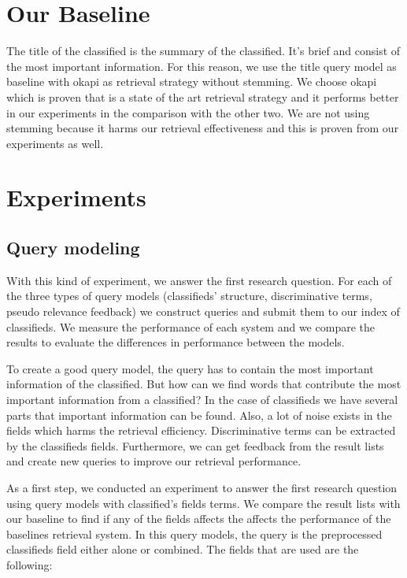 \section{Our Baseline}
The title of the classified is the summary of the classified. It's brief and consist of the most important information. For this reason, we use the title query model as baseline with okapi as retrieval strategy without stemming. We choose okapi which is proven that is a state of the art retrieval strategy and it performs better in our experiments in the comparison with the other two. We are not using stemming because it harms our retrieval effectiveness and this is proven from our experiments as well.


\section{Experiments}

\subsection{Query modeling}
With this kind of experiment, we answer the first research question. For each of the three types of query models (classifieds' structure, discriminative terms, pseudo relevance feedback) we construct queries and submit them to our index of classifieds. We measure the performance of each system and we compare the results to evaluate the differences in performance between the models.


To create a good query model, the query has to contain the most important information of the classified. But how can we find words that contribute the most important information from a classified? In the case of classifieds we have several parts that important information can be found. Also, a lot of noise exists in the fields which harms the retrieval efficiency. Discriminative terms can be extracted by the classifieds fields. Furthermore, we can get feedback from the result lists and create new queries to improve our retrieval performance.

As a first step, we conducted an experiment to answer the first research question using query models with classified’s fields terms. We compare the result lists with our baseline to find if any of the fields affects the affects the performance of the baselines retrieval system. In this query models, the query is the preprocessed classifieds field either alone or combined. The fields that are used are the following:

